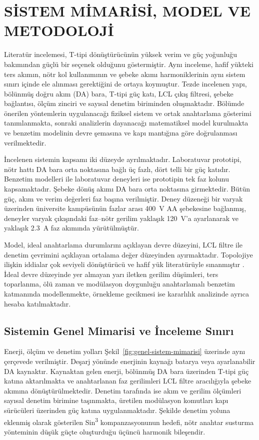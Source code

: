 \chapter{SİSTEM MİMARİSİ, MODEL VE METODOLOJİ}
\label{chap:sistem}


Literatür incelemesi, T-tipi dönüştürücünün yüksek verim ve güç yoğunluğu bakımından güçlü bir seçenek olduğunu göstermiştir. Aynı inceleme, hafif yükteki ters akımın, nötr kol kullanımının ve şebeke akımı harmoniklerinin aynı sistem sınırı içinde ele alınması gerektiğini de ortaya koymuştur. Tezde incelenen yapı, bölünmüş doğru akım (DA) bara, T-tipi güç katı, LCL çıkış filtresi, şebeke bağlantısı, ölçüm zinciri ve sayısal denetim biriminden oluşmaktadır. Bölümde önerilen yöntemlerin uygulanacağı fiziksel sistem ve ortak anahtarlama gösterimi tanımlanmakta, sonraki analizlerin dayanacağı matematiksel model kurulmakta ve benzetim modelinin devre şemasına ve kapı mantığına göre doğrulanması verilmektedir.

İncelenen sistemin kapsamı iki düzeyde ayrılmaktadır. Laboratuvar prototipi, nötr hattı DA bara orta noktasına bağlı üç fazlı, dört telli bir güç katıdır. Benzetim modelleri ile laboratuvar deneyleri ise prototipin tek faz kolunu kapsamaktadır. Şebeke dönüş akımı DA bara orta noktasına girmektedir. Bütün güç, akım ve verim değerleri faz başına verilmiştir. Deney düzeneği bir varyak üzerinden üniversite kampüsünün fazlar arası \SI{400}{\volt} AA şebekesine bağlanmış, deneyler varyak çıkışındaki faz--nötr gerilim yaklaşık \SI{120}{\volt}'a ayarlanarak ve yaklaşık \SI{2.3}{\ampere} faz akımında yürütülmüştür.

Model, ideal anahtarlama durumlarını açıklayan devre düzeyini, LCL filtre ile denetim çevrimini açıklayan ortalama değer düzeyinden ayırmaktadır. Topolojiye ilişkin iddialar çok seviyeli dönüştürücü ve hafif yük literatürüyle sınanmıştır \citep{Mohan2003,Holmes2003,Schweizer2013,Wang2020,Chen2010}. İdeal devre düzeyinde yer almayan yarı iletken gerilim düşümleri, ters toparlanma, ölü zaman ve modülasyon doygunluğu anahtarlamalı benzetim katmanında modellenmekte, örnekleme gecikmesi ise kararlılık analizinde ayrıca hesaba katılmaktadır.

\section{Sistemin Genel Mimarisi ve İnceleme Sınırı}

Enerji, ölçüm ve denetim yolları Şekil~\ref{fig:genel-sistem-mimarisi} üzerinde aynı çerçevede verilmiştir. Deşarj yönünde enerjinin kaynağı batarya veya ayarlanabilir DA kaynaktır. Kaynaktan gelen enerji, bölünmüş DA bara üzerinden T-tipi güç katına aktarılmakta ve anahtarlanan faz gerilimleri LCL filtre aracılığıyla şebeke akımına dönüştürülmektedir. Denetim tarafında ise akım ve gerilim ölçümleri sayısal denetim birimine taşınmakta, üretilen modülasyon komutları kapı sürücüleri üzerinden güç katına uygulanmaktadır. Şekilde denetim yoluna eklenmiş olarak gösterilen Sin\textsuperscript{3} kompanzasyonunun hedefi, nötr anahtar susturma yönteminin düşük güçte oluşturduğu üçüncü harmonik bileşendir.

